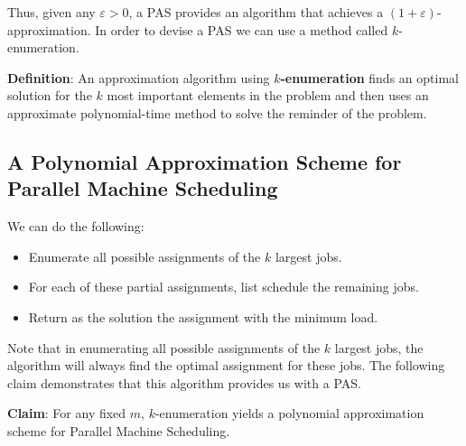\documentclass{article}
\begin{document}
Thus, given any $\varepsilon >0$, a PAS provides an algorithm that achieves a
$(1+\varepsilon)$-approximation. In order to devise a PAS we can use a method called
$k$-enumeration.

\textbf{Definition}:
An approximation algorithm using \textbf{$k$-enumeration} finds an optimal solution for the $k$
most important elements in the problem and then uses an approximate polynomial-time method to
solve the reminder of the problem.

\subsection{A Polynomial Approximation Scheme for Parallel Machine Scheduling}

We can do the following:

\begin{itemize}

\item Enumerate all possible assignments of the $k$ largest jobs.

\item For each of these partial assignments, list schedule the remaining jobs.

\item Return as the solution the assignment with the minimum load.

\end{itemize}

Note that in enumerating all possible assignments of the $k$ largest jobs, the algorithm will
always find the optimal assignment for these jobs. The following claim demonstrates that this
algorithm provides us with a PAS.

\textbf{Claim}:
For any fixed $m$, $k$-enumeration yields a polynomial approximation scheme for Parallel
Machine Scheduling.
\end{document}
